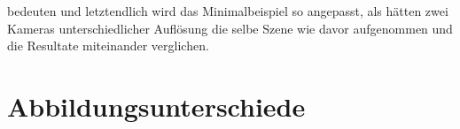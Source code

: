 bedeuten und letztendlich wird das Minimalbeispiel so angepasst, als hätten zwei Kameras unterschiedlicher Auflösung die selbe Szene wie davor aufgenommen und die Resultate miteinander verglichen. 

\section{Abbildungsunterschiede}

%
%
%
%
%
%
%
